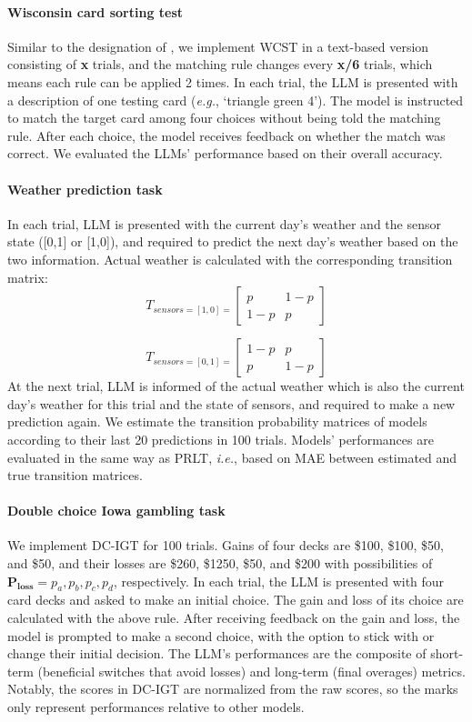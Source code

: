 \paragraph{Wisconsin card sorting test} Similar to the designation of \cite{kennedy2024cognitive}, we implement WCST in a text-based version consisting of \textbf{x} trials, and the matching rule changes every \textbf{x/6} trials, which means each rule can be applied 2 times. In each trial, the LLM is presented with a description of one testing card (\emph{e.g.}, `triangle green 4'). The model is instructed to match the target card among four choices without being told the matching rule. After each choice, the model receives feedback on whether the match was correct. We evaluated the LLMs' performance based on their overall accuracy.

\paragraph{Weather prediction task} In each trial, LLM is presented with the current day's weather and the sensor state ([0,1] or [1,0]), and required to predict the next day's weather based on the two information. Actual weather is calculated with the corresponding transition matrix: 
\[T_{sensors=[1,0]=}\begin{bmatrix}
   p & 1-p \\
   1-p & p
\end{bmatrix}\]

\[T_{sensors=[0,1]=}\begin{bmatrix}
   1-p & p \\
   p &1-p
\end{bmatrix}\]
At the next trial, LLM is informed of the actual weather which is also the current day's weather for this trial and the state of sensors, and required to make a new prediction again. We estimate the transition probability matrices of models according to their last 20 predictions in 100 trials. Models' performances are evaluated in the same way as PRLT, \emph{i.e.}, based on MAE between estimated and true transition matrices. 

\paragraph{Double choice Iowa gambling task} We implement DC-IGT for 100 trials. Gains of four decks are \$100, \$100, \$50, and \$50, and their losses are \$260, \$1250, \$50, and \$200 with possibilities of \(\textbf{P}_\textbf{loss}={p_a, p_b, p_c, p_d}\), respectively. In each trial, the LLM is presented with four card decks and asked to make an initial choice. The gain and loss of its choice are calculated with the above rule. After receiving feedback on the gain and loss, the model is prompted to make a second choice, with the option to stick with or change their initial decision. The LLM's performances are the composite of short-term (beneficial switches that avoid losses) and long-term (final overages) metrics. Notably, the scores in DC-IGT are normalized from the raw scores, so the marks only represent performances relative to other models.

